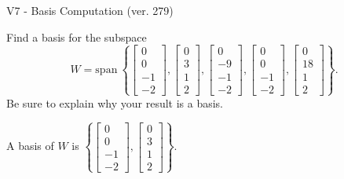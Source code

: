 \begin{exercise}
  \begin{exerciseTitle}V7 - Basis Computation (ver. 279)\end{exerciseTitle}
  \begin{exerciseStatement}
    Find a basis for the subspace 
\[W=\mathrm{span}\ \left\{\left[\begin{array}{r}
0 \\
0 \\
-1 \\
-2
\end{array}\right] , \left[\begin{array}{r}
0 \\
3 \\
1 \\
2
\end{array}\right] , \left[\begin{array}{r}
0 \\
-9 \\
-1 \\
-2
\end{array}\right] , \left[\begin{array}{r}
0 \\
0 \\
-1 \\
-2
\end{array}\right] , \left[\begin{array}{r}
0 \\
18 \\
1 \\
2
\end{array}\right]\right\}.\]
 Be sure to explain why your result is a basis.


  \end{exerciseStatement}
  \begin{exerciseAnswer}
   A basis of \(W\) is  \(\left\{\left[\begin{array}{r}
0 \\
0 \\
-1 \\
-2
\end{array}\right] , \left[\begin{array}{r}
0 \\
3 \\
1 \\
2
\end{array}\right]\right\}\).
  


  \end{exerciseAnswer}
\end{exercise}